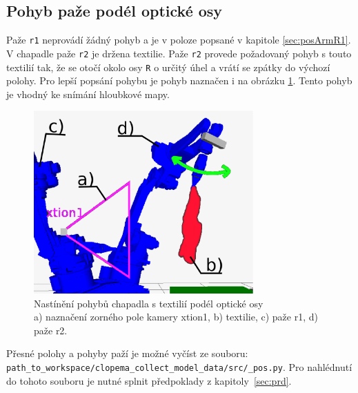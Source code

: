 \documentclass[10pt,a4paper,titlepage,oneside]{report}
\begin{document}
\newpage
\subsection{Pohyb paže podél optické osy}
Paže \verb|r1| neprovádí žádný pohyb a je v poloze popsané v kapitole \ref{sec:posArmR1}. V chapadle paže \verb|r2| je držena textilie. Paže \verb|r2| provede požadovaný pohyb s touto textilií tak, že se otočí okolo osy \verb|R| o určitý úhel a vrátí se zpátky do výchozí polohy. Pro lepší popsání pohybu je pohyb naznačen i na obrázku \ref{fig:rovnoOptOsy}. Tento pohyb je vhodný ke snímání hloubkové mapy.
\\

\begin{figure}[H]
	\centering  	
  	\includegraphics[height=7cm]{pictures/move2.eps}
  	\caption{Nastínění pohybů chapadla s textilií podél optické osy\\
  	a) naznačení zorného pole kamery xtion1, b) textilie, c) paže r1, d) paže r2.}
  	\label{fig:rovnoOptOsy}
\end{figure}



\noindent Přesné polohy a pohyby paží je možné vyčíst ze souboru:\\ \verb|path_to_workspace/clopema_collect_model_data/src/_pos.py|. Pro nahlédnutí do tohoto souboru je nutné splnit předpoklady z kapitoly~\ref{sec:prd}.
\end{document}
